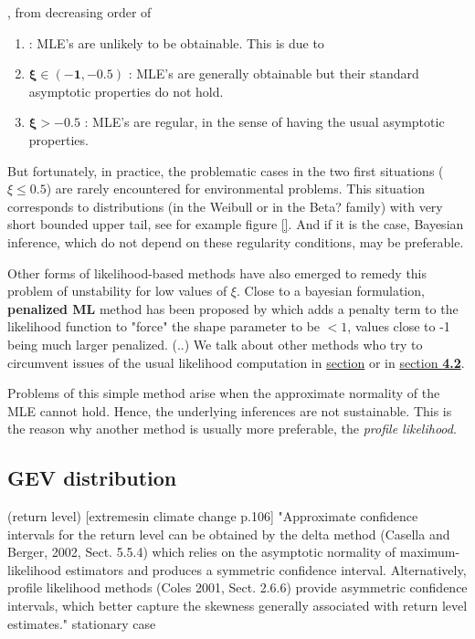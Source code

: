 \documentclass[11pt,a4paper,openany ]{book}
\begin{document}
, from decreasing order of 
\citet[pp.55]{coles_introduction_2001}

\begin{enumerate}
	\item\label{it1lik}  : MLE's are unlikely to be obtainable. This is due to 
	\item $\boldsymbol{\xi\in(-1,-0.5)}$ : MLE's are generally obtainable but their standard asymptotic properties do not hold.
	\item $\boldsymbol{\xi>-0.5}$ : MLE's are regular, in the sense of having the usual asymptotic properties.
\end{enumerate}


But fortunately, in practice, the problematic cases in the two first situations ($\xi\leq 0.5$) are rarely encountered for environmental problems. This situation corresponds to distributions (in the Weibull or in the Beta? family) with very short bounded upper tail, see for example figure \ref{}.
And if it is the case, Bayesian inference, which do not depend on these regularity conditions, may be preferable.

Other forms of likelihood-based methods have also emerged to remedy this problem of unstability for low values of $\xi$. Close to a bayesian formulation, \textbf{ penalized ML} method has been proposed by \citet{coles_likelihood-based_1999} which adds a penalty term to the likelihood function to "force" the shape parameter to be $<1$, %
values close to -1 being much larger penalized. (..) We talk about other methods who try to circumvent issues of the usual likelihood computation in \hyperref[pwmm]{section} or in \hyperref[improvinf]{section\textbf{ 4.2}}.

Problems of this simple method arise when the approximate normality of the MLE cannot hold. Hence, the underlying inferences are not sustainable. This is the reason why another method is usually more preferable, the \emph{profile likelihood}.



\subsection*{GEV distribution}

(return level) [extremesin climate change p.106] "Approximate confidence intervals for the return level can be obtained by the
delta method (Casella and Berger, 2002, Sect. 5.5.4) which relies on the asymptotic
normality of maximum-likelihood estimators and produces a symmetric confidence
interval. Alternatively, profile likelihood methods (Coles 2001, Sect. 2.6.6) provide
asymmetric confidence intervals, which better capture the skewness generally
associated with return level estimates." stationary case
\end{document}
